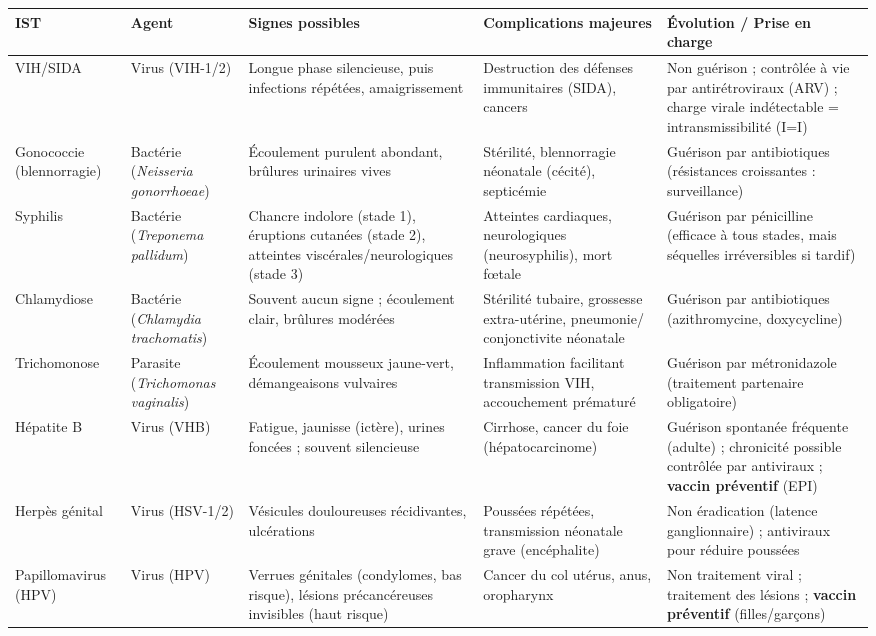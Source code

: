 \documentclass[11pt]{article}
\begin{document}
\begin{center}
\begin{tabularx}{\linewidth}{|l|l|X|X|X|}
\hline
\rowcolor{popblueL} \textbf{IST} & \textbf{Agent} & \textbf{Signes possibles} & \textbf{Complications majeures} & \textbf{Évolution / Prise en charge} \\
\hline
VIH/SIDA & Virus (VIH-1/2) & Longue phase silencieuse, puis infections répétées, amaigrissement & Destruction des défenses immunitaires (SIDA), cancers & Non guérison ; contrôlée à vie par antirétroviraux (ARV) ; charge virale indétectable = intransmissibilité (I=I) \\
\hline
Gonococcie (blennorragie) & Bactérie (\emph{Neisseria gonorrhoeae}) & Écoulement purulent abondant, brûlures urinaires vives & Stérilité, blennorragie néonatale (cécité), septicémie & Guérison par antibiotiques (résistances croissantes : surveillance) \\
\hline
Syphilis & Bactérie (\emph{Treponema pallidum}) & Chancre indolore (stade 1), éruptions cutanées (stade 2), atteintes viscérales/neurologiques (stade 3) & Atteintes cardiaques, neurologiques (neurosyphilis), mort fœtale & Guérison par pénicilline (efficace à tous stades, mais séquelles irréversibles si tardif) \\
\hline
Chlamydiose & Bactérie (\emph{Chlamydia trachomatis}) & Souvent aucun signe ; écoulement clair, brûlures modérées & Stérilité tubaire, grossesse extra-utérine, pneumonie/ conjonctivite néonatale & Guérison par antibiotiques (azithromycine, doxycycline) \\
\hline
Trichomonose & Parasite (\emph{Trichomonas vaginalis}) & Écoulement mousseux jaune-vert, démangeaisons vulvaires & Inflammation facilitant transmission VIH, accouchement prématuré & Guérison par métronidazole (traitement partenaire obligatoire) \\
\hline
Hépatite B & Virus (VHB) & Fatigue, jaunisse (ictère), urines foncées ; souvent silencieuse & Cirrhose, cancer du foie (hépatocarcinome) & Guérison spontanée fréquente (adulte) ; chronicité possible contrôlée par antiviraux ; \textbf{vaccin préventif} (EPI) \\
\hline
Herpès génital & Virus (HSV-1/2) & Vésicules douloureuses récidivantes, ulcérations & Poussées répétées, transmission néonatale grave (encéphalite) & Non éradication (latence ganglionnaire) ; antiviraux pour réduire poussées \\
\hline
Papillomavirus (HPV) & Virus (HPV) & Verrues génitales (condylomes, bas risque), lésions précancéreuses invisibles (haut risque) & Cancer du col utérus, anus, oropharynx & Non traitement viral ; traitement des lésions ; \textbf{vaccin préventif} (filles/garçons) \\
\hline
\end{tabularx}
\end{center}
\end{document}
